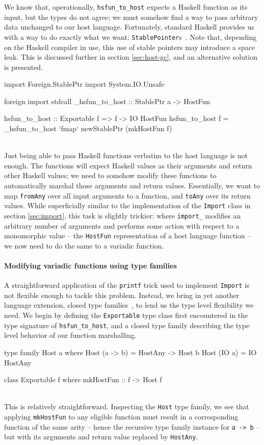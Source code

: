 \documentclass[preprint]{sigplanconf}
\begin{document}
We know that, operationally, \lstinline!hsfun_to_host! expects a Haskell
function as its input, but the types do not agree; we must somehow find a way
to pass arbitrary data unchanged to our host language.
Fortunately, standard Haskell provides us with a way to do exactly what we want:
\lstinline!StablePointer!s\ \cite{stableptr}. Note that, depending on the
Haskell compiler in use, this use of stable pointers may introduce a space
leak. This is discussed further in section \ref{sec:host-gc}, and an
alternative solution is presented.\\
\begin{code}
import Foreign.StablePtr
import System.IO.Unsafe

foreign import stdcall
  _hsfun_to_host :: StablePtr a -> HostFun

hsfun_to_host :: Exportable f => f -> IO HostFun
hsfun_to_host f =
  _hsfun_to_host `fmap` newStablePtr (mkHostFun f)
\end{code}\\
Just being able to pass Haskell functions verbatim to the host language is not
enough. The functions will expect Haskell values as their arguments and return
other Haskell values; we need to somehow modify these functions to
automatically marshal those arguments and return values.
Essentially, we want to map
\lstinline!fromAny! over all input arguments to a function, and
\lstinline!toAny! over its return values.
While superficially similar to the implementation of the \lstinline!Import!
class in section \ref{sec:import}, this task is slightly trickier:
where \lstinline!import_! modifies an arbitrary number of arguments and
performs some action with respect to a monomorphic value -- the
\lstinline!HostFun! representation of a host language function -- we now need
to do the same to a variadic function.

\paragraph{Modifying variadic functions using type families}
A straightforward application of the \lstinline!printf! trick used to
implement \lstinline!Import! is not flexible
enough to tackle this problem. Instead, we bring in yet another language
extension, closed type families\ \cite{closedtypefamilies}, to lend us the type
level flexibility we need. We begin by defining the \lstinline!Exportable!
type class first encountered in the type signature of \lstinline!hsfun_to_host!,
and a closed type family describing the type level behavior of our function
marshalling.\\
\begin{code}
type family Host a where
  Host (a -> b) = HostAny -> Host b
  Host (IO a)   = IO HostAny

class Exportable f where
  mkHostFun :: f -> Host f
\end{code}\\
This is relatively straightforward. Inspecting the \lstinline!Host! type
family, we see that applying \lstinline!mkHostFun! to any eligible function
must result in a corresponding function of the same arity -- hence the
recursive type family instance for \lstinline!a -> b! -- but with its
arguments and return value replaced by \lstinline!HostAny!.
\end{document}

